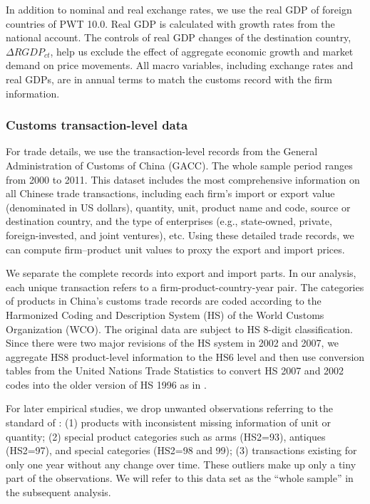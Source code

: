\documentclass[12pt]{article}
\begin{document}
In addition to nominal and real exchange rates, we use the real GDP of foreign countries of PWT 10.0. Real GDP is calculated with growth rates from the national account. The controls of real GDP changes of the destination country, $\Delta RGDP_{ct}$, help us exclude the effect of aggregate economic growth and market demand on price movements. All macro variables, including exchange rates and real GDPs, are in annual terms to match the customs record with the firm information.

\subsubsection{Customs transaction-level data} \label{Data-Customs}

For trade details, we use the transaction-level records from the General Administration of Customs of China (GACC). The whole sample period ranges from 2000 to 2011. This dataset includes the most comprehensive information on all Chinese trade transactions, including each firm's import or export value (denominated in US dollars), quantity, unit, product name and code, source or destination country, and the type of enterprises (e.g., state-owned, private, foreign-invested, and joint ventures), etc. Using these detailed trade records, we can compute firm–product unit values to proxy the export and import prices.

We separate the complete records into export and import parts. In our analysis, each unique transaction refers to a firm-product-country-year pair. The categories of products in China's customs trade records are coded according to the Harmonized Coding and Description System (HS) of the World Customs Organization (WCO). The original data are subject to HS 8-digit classification. Since there were two major revisions of the HS system in 2002 and 2007, we aggregate HS8 product-level information to the HS6 level and then use conversion tables from the United Nations Trade Statistics to convert HS 2007 and 2002 codes into the older version of HS 1996 as in \cite{fan-li-yeaple2015}.

For later empirical studies, we drop unwanted observations referring to the standard of \cite{lmx2015}: (1) products with inconsistent missing information of unit or quantity; (2) special product categories such as arms (HS2=93), antiques (HS2=97), and special categories (HS2=98 and 99); (3) transactions existing for only one year without any change over time. These outliers make up only a tiny part of the observations. We will refer to this data set as the ``whole sample'' in the subsequent analysis.
\end{document}
